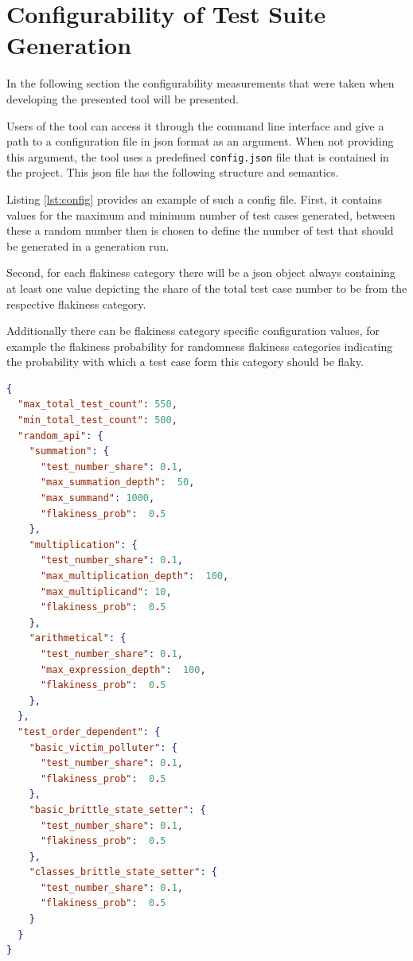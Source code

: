 \documentclass[
fancyheadings, %
%
%
]{stsreprt}
\begin{document}
\section{Configurability of Test Suite Generation}
In the following section the configurability measurements that were taken when developing the presented tool will be presented. \par
Users of the tool can access it through the command line interface and give a path to a configuration file in \acrlong{json} format as an argument. 
When not providing this argument, the tool uses a predefined \lstinline{config.json} file that is contained in the project.
This \acrshort{json} file has the following structure and semantics. \par 
Listing \ref{lst:config} provides an example of such a config file.
First, it contains values for the maximum and minimum number of test cases generated, between these a random number then is chosen to define the number of test that should be generated in a generation run. \par
Second, for each flakiness category there will be a \acrshort{json} object always containing at least one value depicting the share of the total test case number to be from the respective flakiness category. \par
Additionally there can be flakiness category specific configuration values, for example the flakiness probability for randomness flakiness categories indicating the probability with which a test case form this category should be flaky.  

\begin{lstlisting}[language=json,firstnumber=1, caption={Examplary \lstinline{config.json} file}, label=lst:config]
{
  "max_total_test_count": 550,
  "min_total_test_count": 500,
  "random_api": {
    "summation": {
      "test_number_share": 0.1,
      "max_summation_depth":  50,
      "max_summand": 1000,
      "flakiness_prob":  0.5
    },
    "multiplication": {
      "test_number_share": 0.1,
      "max_multiplication_depth":  100,
      "max_multiplicand": 10,
      "flakiness_prob":  0.5
    },
    "arithmetical": {
      "test_number_share": 0.1,
      "max_expression_depth":  100,
      "flakiness_prob":  0.5
    },
  },
  "test_order_dependent": {
    "basic_victim_polluter": {
      "test_number_share": 0.1,
      "flakiness_prob":  0.5
    },
    "basic_brittle_state_setter": {
      "test_number_share": 0.1,
      "flakiness_prob":  0.5
    },
    "classes_brittle_state_setter": {
      "test_number_share": 0.1,
      "flakiness_prob":  0.5
    }
  }
}
\end{lstlisting}
\end{document}
